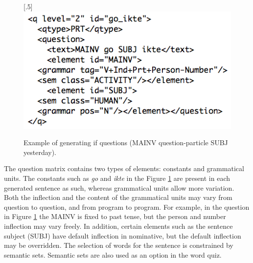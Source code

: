 \documentclass[11pt]{article}
\begin{document}
\begin{figure}[htbp]
\begin{center}
\scalebox{.5}[.5]{\includegraphics{presentation/img/question_vasta2.png}}\\
\caption{Example of generating if questions (MAINV question-particle SUBJ yesterday).}
\label{questionv}
\end{center}
\end{figure}

The question matrix contains two types of elements: constants and grammatical units. The constants such as \textit{go} and \textit{ikte} in the Figure \ref{questionv} are present in each generated sentence as such, whereas grammatical units allow more variation. Both the inflection and the content of the grammatical units may vary from question to question, and from program to program. For example, in the question in Figure \ref{questionv} the MAINV is fixed to past tense, but the person and number inflection may vary freely. In addition, certain elements such as the sentence subject (SUBJ) have default inflection in nominative, but the default inflection may be overridden. The selection of words for the sentence is constrained by semantic sets. Semantic sets are also used as an option in the word quiz. 
%
\end{document}
